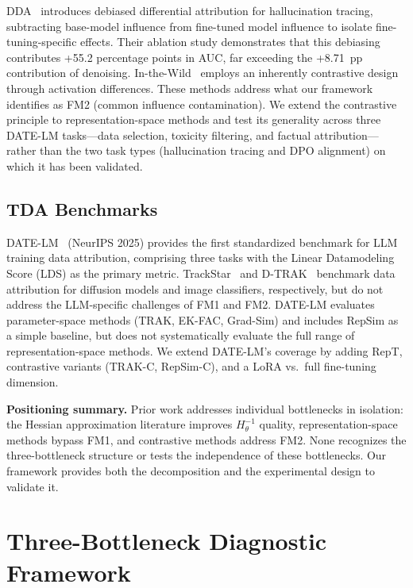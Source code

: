 \documentclass{article}
\begin{document}
DDA~\citep{zhang2024dda} introduces debiased differential attribution for hallucination tracing, subtracting base-model influence from fine-tuned model influence to isolate fine-tuning-specific effects. Their ablation study demonstrates that this debiasing contributes +55.2 percentage points in AUC, far exceeding the +8.71~pp contribution of denoising. In-the-Wild~\citep{wang2024inthewild} employs an inherently contrastive design through activation differences. These methods address what our framework identifies as FM2 (common influence contamination). We extend the contrastive principle to representation-space methods and test its generality across three DATE-LM tasks---data selection, toxicity filtering, and factual attribution---rather than the two task types (hallucination tracing and DPO alignment) on which it has been validated.

\subsection{TDA Benchmarks}

DATE-LM~\citep{engstrom2024datelm} (NeurIPS 2025) provides the first standardized benchmark for LLM training data attribution, comprising three tasks with the Linear Datamodeling Score (LDS) as the primary metric. TrackStar~\citep{georgiev2023trackstar} and D-TRAK~\citep{park2023dtrak} benchmark data attribution for diffusion models and image classifiers, respectively, but do not address the LLM-specific challenges of FM1 and FM2. DATE-LM evaluates parameter-space methods (TRAK, EK-FAC, Grad-Sim) and includes RepSim as a simple baseline, but does not systematically evaluate the full range of representation-space methods. We extend DATE-LM's coverage by adding RepT, contrastive variants (TRAK-C, RepSim-C), and a LoRA vs.\ full fine-tuning dimension.

\textbf{Positioning summary.} Prior work addresses individual bottlenecks in isolation: the Hessian approximation literature improves $H_\theta^{-1}$ quality, representation-space methods bypass FM1, and contrastive methods address FM2. None recognizes the three-bottleneck structure or tests the independence of these bottlenecks. Our framework provides both the decomposition and the experimental design to validate it.

\section{Three-Bottleneck Diagnostic Framework}
\label{sec:framework}
\end{document}
